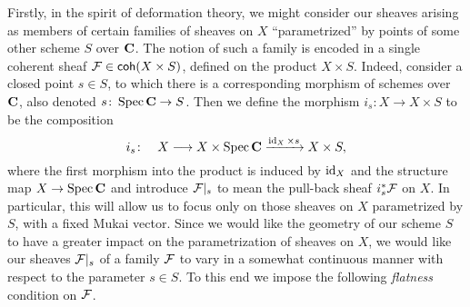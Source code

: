Firstly, in the spirit of deformation theory, we might consider our sheaves arising as members of certain families of sheaves on $X$ ``parametrized'' by points of some other scheme $S$ over $\mathbf C$. The notion of such a family is encoded in a single coherent sheaf $\mathcal F \in \mathsf{coh}(X \times S)$, defined on the product $X \times S$. Indeed, consider a closed point $s \in S$, to which there is a corresponding morphism of schemes over $\mathbf C$, also denoted $s \colon \operatorname{Spec}\mathbf C \to S$. Then we define the morphism $i_s \colon X \to X \times S$ to be the composition
\begin{equation}
    \label{eq: inclusion of X to X x S}
    i_s \colon \quad X \longrightarrow X \times \operatorname{Spec}\mathbf C \xrightarrow{\operatorname{id}_{X} \times s} X \times S,
\end{equation}
where the first morphism into the product is induced by $\operatorname{id}_{X}$ and the structure map $X \to \operatorname{Spec}\mathbf C$ and introduce $\mathcal F|_s$ to mean the pull-back sheaf $i_s^*\mathcal F$ on $X$. In particular, this will allow us to focus only on those sheaves on $X$ parametrized by $S$, with a fixed Mukai vector.
Since we would like the geometry of our scheme $S$ to have a greater impact on the parametrization of sheaves on $X$, we would like our sheaves $\mathcal F|_s$ of a family $\mathcal F$ to vary in a somewhat continuous manner with respect to the parameter $s \in S$. To this end we impose the following \emph{flatness} condition on $\mathcal F$. 





